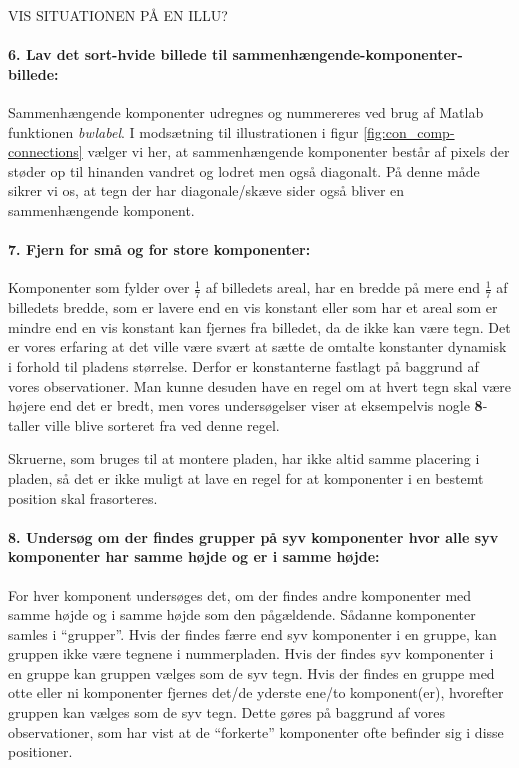 VIS SITUATIONEN PÅ EN ILLU?

\paragraph{6. Lav det sort-hvide billede til sammenhængende-komponenter-billede:} Sammenhængende komponenter udregnes og nummereres ved brug af Matlab funktionen \textit{bwlabel}. I modsætning til illustrationen i figur \vref{fig:con_comp-connections} vælger vi her, at sammenhængende komponenter består af pixels der støder op til hinanden vandret og lodret men også diagonalt. På denne måde sikrer vi os, at tegn der har diagonale/skæve sider også bliver en sammenhængende komponent.

\paragraph{7. Fjern for små og for store komponenter:} Komponenter som fylder over $\frac{1}{7}$ af billedets areal, har en bredde på mere end $\frac{1}{7}$ af billedets bredde, som er lavere end en vis konstant eller som har et areal som er mindre end en vis konstant kan fjernes fra billedet, da de ikke kan være tegn. Det er vores erfaring at det ville være svært at sætte de omtalte konstanter dynamisk i forhold til pladens størrelse. Derfor er konstanterne fastlagt på baggrund af vores observationer. Man kunne desuden have en regel om at hvert tegn skal være højere end det er bredt, men vores undersøgelser viser at eksempelvis nogle \textbf{8}-taller ville blive sorteret fra ved denne regel.

Skruerne, som bruges til at montere pladen, har ikke altid samme placering i pladen, så det er ikke muligt at lave en regel for at komponenter i en bestemt position skal frasorteres.

\paragraph{8. Undersøg om der findes grupper på syv komponenter hvor alle syv komponenter har samme højde og er i samme højde:} For hver komponent undersøges det, om der findes andre komponenter med samme højde og i samme højde som den pågældende. Sådanne komponenter samles i ``grupper''. Hvis der findes færre end syv komponenter i en gruppe, kan gruppen ikke være tegnene i nummerpladen. Hvis der findes syv komponenter i en gruppe kan gruppen vælges som de syv tegn. Hvis der findes en gruppe med otte eller ni komponenter fjernes det/de yderste ene/to komponent(er), hvorefter gruppen kan vælges som de syv tegn. Dette gøres på baggrund af vores observationer, som har vist at de ``forkerte'' komponenter ofte befinder sig i disse positioner.

